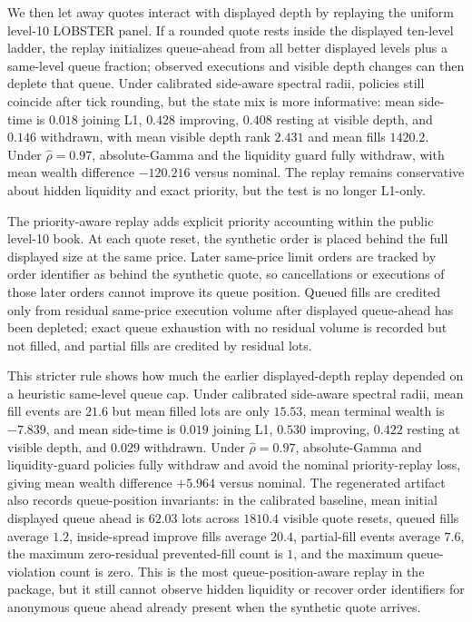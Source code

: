 \documentclass[11pt]{article}
\begin{document}
We then let away quotes interact with displayed depth by replaying the uniform
level-10 LOBSTER panel. If a rounded quote rests inside the displayed ten-level
ladder, the replay initializes queue-ahead from all better displayed levels
plus a same-level queue fraction; observed executions and visible depth changes
can then deplete that queue. Under calibrated side-aware spectral radii,
policies still coincide after tick rounding, but the state mix is more
informative: mean side-time is $0.018$ joining L1, $0.428$ improving, $0.408$
resting at visible depth, and $0.146$ withdrawn, with mean visible depth rank
$2.431$ and mean fills $1420.2$. Under $\hat\rho=0.97$, absolute-Gamma and the
liquidity guard fully withdraw, with mean wealth difference $-120.216$ versus
nominal. The replay remains conservative about hidden liquidity and exact
priority, but the test is no longer L1-only.

The priority-aware replay adds explicit priority accounting within the public
level-10 book. At each quote reset, the synthetic order is placed behind the
full displayed size at the same price. Later same-price limit orders are
tracked by order identifier as behind the synthetic quote, so cancellations or
executions of those later orders cannot improve its queue position. Queued
fills are credited only from residual same-price execution volume after
displayed queue-ahead has been depleted; exact queue exhaustion with no
residual volume is recorded but not filled, and partial fills are credited by
residual lots.

This stricter rule shows how much the earlier displayed-depth replay depended
on a heuristic same-level queue cap. Under calibrated side-aware spectral
radii, mean fill events are $21.6$ but mean filled lots are only $15.53$, mean
terminal wealth is $-7.839$, and mean side-time is $0.019$ joining L1, $0.530$
improving, $0.422$ resting at visible depth, and $0.029$ withdrawn. Under
$\hat\rho=0.97$, absolute-Gamma and liquidity-guard policies fully withdraw
and avoid the nominal priority-replay loss, giving mean wealth difference
$+5.964$ versus nominal. The regenerated artifact also records queue-position
invariants: in the calibrated baseline, mean initial displayed queue ahead is
$62.03$ lots across $1810.4$ visible quote resets, queued fills average $1.2$,
inside-spread improve fills average $20.4$, partial-fill events average $7.6$,
the maximum zero-residual prevented-fill count is $1$, and the maximum
queue-violation count is zero. This is the most queue-position-aware replay in
the package, but it still cannot observe hidden liquidity or recover order
identifiers for anonymous queue ahead already present when the synthetic quote
arrives.
\end{document}
